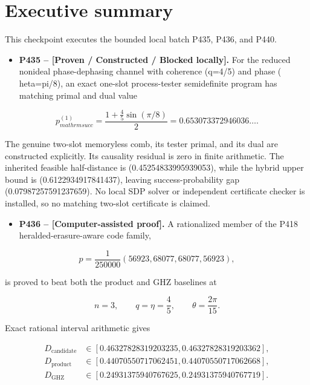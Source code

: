 \documentclass[11pt,a4paper,openany]{report}
\begin{document}
\tableofcontents
\clearpage
{}

\chapter{Executive summary}

This checkpoint executes the bounded local batch P435, P436, and P440.

\begin{itemize}
\item 
\textbf{P435 -- [Proven /\allowbreak{} Constructed /\allowbreak{} Blocked locally].} For the reduced nonideal phase-dephasing channel with coherence (q=4/\allowbreak{}5) and phase (	heta=pi/\allowbreak{}8), an exact one-slot process-tester semidefinite program has matching primal and dual value

\end{itemize}

\[
p_{mathrm{succ}}^{(1)}
=\frac{1+\frac45\sin(\pi/8)}2
=0.653073372946036\ldots.
\]

The genuine two-slot memoryless comb, its tester primal, and its dual are constructed explicitly. Its causality residual is zero in finite arithmetic. The inherited feasible half-distance is (0.45254833995939053), while the hybrid upper bound is (0.6122934917841437), leaving success-probability gap (0.07987257591237659). No local SDP solver or independent certificate checker is installed, so no matching two-slot certificate is claimed.

\begin{itemize}
\item 
\textbf{P436 -- \textcolor{fingreen}{[Computer-assisted proof]}.} A rationalized member of the P418 heralded-erasure-aware code family,

\end{itemize}

\[
p=\frac1{250000}(56923,68077,68077,56923),
\]

is proved to beat both the product and GHZ baselines at

\[
n=3,\qquad q=\eta=\frac45,\qquad \theta=\frac{2\pi}{15}.
\]

Exact rational interval arithmetic gives

\[
\begin{aligned}
D_{\mathrm{candidate}}&\in
[0.46327828319203235,0.46327828319203362],\\
D_{\mathrm{product}}&\in
[0.44070550717062451,0.44070550717062668],\\
D_{\mathrm{GHZ}}&\in
[0.24931375940767625,0.24931375940767719].
\end{aligned}
\]
\end{document}
